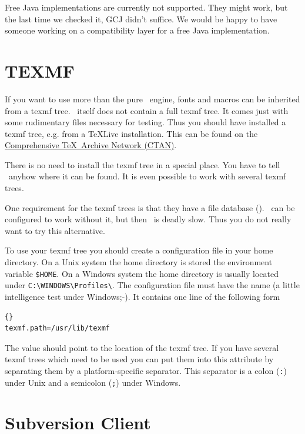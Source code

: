 Free Java implementations are currently not supported. They might
work, but the last time we checked it, GCJ didn't suffice. We would be
happy to have someone working on a compatibility layer for a free Java
implementation.


\section{TEXMF}

If you want to use more than the pure \ExTeX\ engine, fonts and macros
can be inherited from a texmf tree. \ExTeX\ itself does
not contain a full texmf tree. It comes just with some rudimentary
files necessary for testing. Thus you should have installed a texmf
tree, e.g. from a \TeX Live installation.
This can be found on the \href{http://www.ctan.org}{Comprehensive
  \TeX\ Archive Network (CTAN)}.

There is no need to install the texmf tree in a special place. You
have to tell \ExTeX\ anyhow where it can be found. It is even possible
to work with several texmf trees.

One requirement for the texmf trees is that they have a file database
(). \ExTeX\ can be configured to work without it, but then
\ExTeX\ is deadly slow. Thus you do not really want to try this
alternative.

To use your texmf tree you should create a configuration file in your
home directory. On a Unix system the home directory is stored the
environment variable \verb|$HOME|. On a Windows system the home
directory is usually located under \verb|C:\WINDOWS\Profiles\|.  The
configuration file must have the name  (a little
intelligence test under Windows;-). It contains one line of the
following form

\begin{lstlisting}{}
texmf.path=/usr/lib/texmf
\end{lstlisting}

The value should point to the location of the texmf tree. If you have
several texmf trees which need to be used you can put them into this
attribute by separating them by a platform-specific separator. This
separator is a colon (\verb|:|) under Unix and a semicolon (\verb|;|)
under Windows.


\section{Subversion Client}

